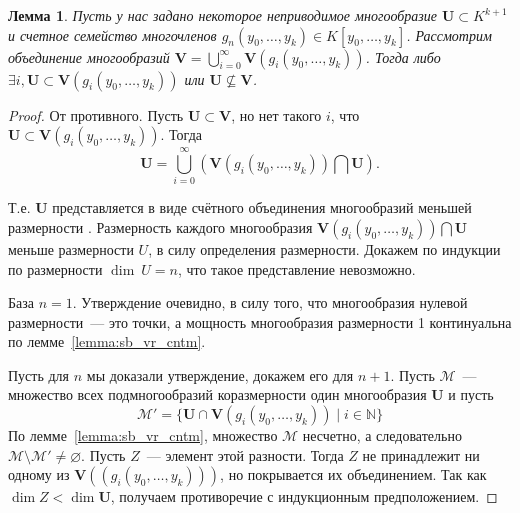 \documentclass[16pt]{article}
\theoremstyle{plain}
\newtheorem{lemma}[theorem]{Лемма}
\theoremstyle{definition}
\theoremstyle{remark}
\begin{document}
\begin{lemma} \label{lemma:o vlojenii}
Пусть у нас задано некоторое неприводимое многообразие
$\mathbf{U}\subset K^{k+1}$ и счетное семейство многочленов
$g_n(y_0,\ldots, y_k)\in K[y_0,\ldots, y_k ]$. Рассмотрим объединение
многообразий $ \mathbf{V}=\bigcup\limits
_{i=0}^{\infty}\mathbf{V}(g_i(y_0,\ldots, y_k))$. Тогда либо
$\exists i, \mathbf{U} \subset \mathbf{V}(g_i(y_0,\ldots, y_k))$ или
$\mathbf{U}\nsubseteq \mathbf{V}$.
\end{lemma}



\begin{proof}
От противного. Пусть $\mathbf{U}\subset \mathbf{V}$, но нет такого
$i$, что $\mathbf{U} \subset \mathbf{V}(g_i(y_0,\ldots, y_k))$.
Тогда
$$
\mathbf{U}=\bigcup\limits_{i=0}^{\infty}(\mathbf{V}(g_i(y_0,\ldots,
y_k))\bigcap \mathbf{U}).
$$


Т.е. $\mathbf{U}$ представляется в виде счётного объединения
многообразий меньшей размерности . Размерность каждого многообразия
$\mathbf{V}(g_i(y_0,\ldots, y_k))\bigcap \mathbf{U}$ меньше
размерности $U$, в силу определения размерности. Докажем по индукции
по размерности $\dim~U=n$,
что такое представление невозможно.

База $n=1$. Утверждение очевидно, в силу того, что многообразия
нулевой размерности~--- это точки, а мощность многообразия
размерности 1 континуальна по лемме~\ref{lemma:sb_vr_cntm}.




 Пусть для $n$ мы доказали утверждение, докажем его для $n+1$.
Пусть $\mathcal M$~--- множество всех подмногообразий коразмерности
один многообразия $\mathbf{U}$ и пусть
$$
\mathcal M' = \{ \mathbf{U}\cap \mathbf{V}(g_i(y_0,\ldots,y_k))\mid
i\in \mathbb N \}
$$
По лемме~\ref{lemma:sb_vr_cntm}, множество $\mathcal M$ несчетно, а
следовательно $\mathcal M\setminus\mathcal M'\neq \varnothing$.
Пусть $Z$~--- элемент этой разности. Тогда $Z$ не принадлежит ни
одному из $\mathbf{V}((g_i(y_0,\ldots,y_k)))$, но покрывается их
объединением. Так как $\dim Z<\dim \mathbf{U}$, получаем
противоречие с индукционным предположением.



\end{proof}
\end{document}
